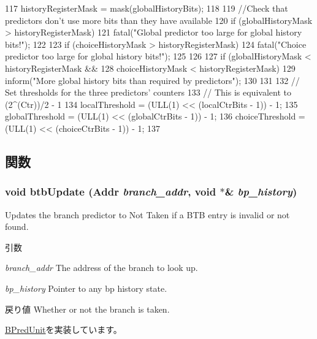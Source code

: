 \begin{DoxyCode}
{117     historyRegisterMask = mask(globalHistoryBits);
118 
119     //Check that predictors don't use more bits than they have available
120     if (globalHistoryMask > historyRegisterMask) {
121         fatal("Global predictor too large for global history bits!\n");
122     }
123     if (choiceHistoryMask > historyRegisterMask) {
124         fatal("Choice predictor too large for global history bits!\n");
125     }
126 
127     if (globalHistoryMask < historyRegisterMask &&
128         choiceHistoryMask < historyRegisterMask) {
129         inform("More global history bits than required by predictors\n");
130     }
131 
132     // Set thresholds for the three predictors' counters
133     // This is equivalent to (2^(Ctr))/2 - 1
134     localThreshold  = (ULL(1) << (localCtrBits  - 1)) - 1;
135     globalThreshold = (ULL(1) << (globalCtrBits - 1)) - 1;
136     choiceThreshold = (ULL(1) << (choiceCtrBits - 1)) - 1;
137 }
\end{DoxyCode}


\subsection{関数}
\hypertarget{classTournamentBP_a101ada238eecd07cc6905c60272e2693}{
\subsubsection[{btbUpdate}]{\setlength{\rightskip}{0pt plus 5cm}void btbUpdate ({\bf Addr} {\em branch\_\-addr}, \/  void $\ast$\& {\em bp\_\-history})}}
\label{classTournamentBP_a101ada238eecd07cc6905c60272e2693}
Updates the branch predictor to Not Taken if a BTB entry is invalid or not found. 
\begin{DoxyParams}{引数}
\item[{\em branch\_\-addr}]The address of the branch to look up. \item[{\em bp\_\-history}]Pointer to any bp history state. \end{DoxyParams}
\begin{DoxyReturn}{戻り値}
Whether or not the branch is taken. 
\end{DoxyReturn}


\hyperlink{classBPredUnit_a7b687ebde63095b00a0b083ba6607cd4}{BPredUnit}を実装しています。


